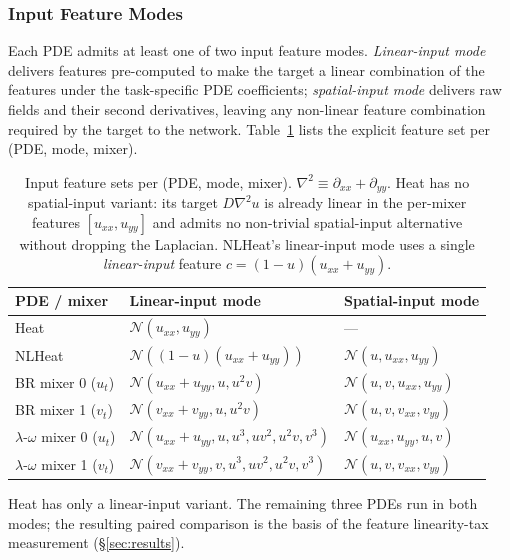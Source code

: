 \documentclass[10pt,journal,compsoc]{IEEEtran}
\begin{document}
\subsubsection{Input Feature Modes}\label{subsubsec:input_feature_modes}

Each PDE admits at least one of two input feature modes. \emph{Linear-input
mode} delivers features pre-computed to make the target a linear
combination of the features under the task-specific PDE coefficients;
\emph{spatial-input mode} delivers raw fields and their second
derivatives, leaving any non-linear feature combination required by the
target to the network. Table~\ref{tab:input_feature_modes} lists the
explicit feature set per (PDE, mode, mixer).

\begin{table}[!t]
\centering
\caption{Input feature sets per (PDE, mode, mixer). $\nabla^2 \equiv
\partial_{xx} + \partial_{yy}$. Heat has no spatial-input variant: its
target $D\nabla^2 u$ is already linear in the per-mixer features
$[u_{xx}, u_{yy}]$ and admits no non-trivial spatial-input alternative
without dropping the Laplacian. NLHeat's linear-input mode uses a single
\emph{linear-input} feature $c = (1{-}u)(u_{xx}{+}u_{yy})$.}
\label{tab:input_feature_modes}
\small
\begin{tabular}{@{}lll@{}}
\toprule
PDE / mixer & Linear-input mode & Spatial-input mode \\
\midrule
Heat                  & $\mathcal{N}(u_{xx}, u_{yy})$            & --- \\
NLHeat                & $\mathcal{N}((1-u)(u_{xx}+u_{yy}))$      & $\mathcal{N}(u, u_{xx}, u_{yy})$ \\
BR mixer 0 ($u_t$)    & $\mathcal{N}(u_{xx} + u_{yy}, u, u^2 v)$      & $\mathcal{N}(u, v, u_{xx}, u_{yy})$ \\
BR mixer 1 ($v_t$)    & $\mathcal{N}(v_{xx} + v_{yy}, u, u^2 v)$      & $\mathcal{N}(u, v, v_{xx}, v_{yy})$ \\
$\lambda$-$\omega$ mixer 0 ($u_t$)
					  & $\mathcal{N}(u_{xx} + u_{yy}, u, u^3, u v^2, u^2 v, v^3)$
					  & $\mathcal{N}(u_{xx}, u_{yy}, u, v)$ \\
$\lambda$-$\omega$ mixer 1 ($v_t$)
					  & $\mathcal{N}(v_{xx} + v_{yy}, v, u^3, u v^2, u^2 v, v^3)$
					  & $\mathcal{N}(u, v, v_{xx}, v_{yy})$ \\
\bottomrule
\end{tabular}
\end{table}

Heat has only a linear-input variant. The remaining three PDEs run in
both modes; the resulting paired comparison is the basis of the feature
linearity-tax measurement (\S\ref{sec:results}).
\end{document}
